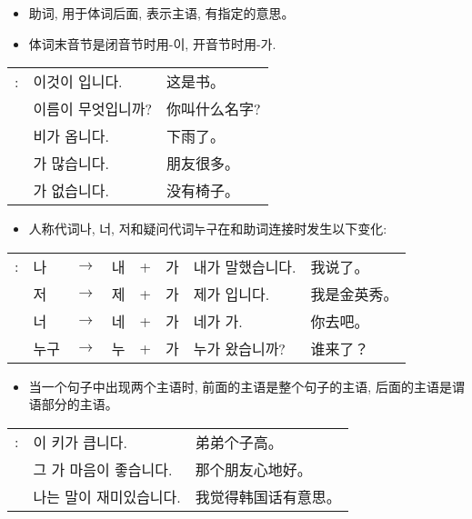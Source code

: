 \begin{grammar}
    \begin{grammarsect}[\kr -이 / -가]
        \begin{itemize}
            \item 助词, 用于体词后面, 表示主语, 有指定的意思。
            \item 体词末音节是闭音节时用{\kr -이}, 开音节时用{\kr -가}.
        \end{itemize}
        \begin{tabular}{lll}
            \kr \ruby{例}{예}:& \kr 이것이 \ruby{冊}{책}입니다.&这是书。\\
            &\kr 이름이 무엇입니까?&你叫什么名字?\\
            &\kr 비가 옵니다.&下雨了。\\
            &\kr \ruby{親舊}{친구}가 많습니다.&朋友很多。\\
            &\kr \ruby{椅子}{의자}가 없습니다.&没有椅子。
        \end{tabular}
        \begin{itemize}
            \item 人称代词{\kr 나, 너, 저}和疑问代词{\kr 누구}在和助词连接时发生以下变化:
        \end{itemize}
        \begin{tabular}{llllllll}
            \kr \ruby{例}{예}:&\kr 나 &$\to$&\kr 내&+&\kr 가&\kr 내가 말했습니다.&我说了。\\
            &\kr 저&$\to$&\kr 제&+ &\kr 가 &\kr 제가 \ruby{金英秀}{김영수}입니다. &我是金英秀。\\
            &\kr 너& $\to$ &\kr 네 &+ &\kr 가 &\kr 네가 가. &你去吧。\\
            &\kr 누구 &$\to$&\kr 누& + &\kr 가 &\kr 누가 왔습니까? &谁来了？\\
        \end{tabular}
        \begin{itemize}
            \item 当一个句子中出现两个主语时, 前面的主语是整个句子的主语, 后面的主语是谓语部分的主语。
        \end{itemize}
        \begin{tabular}{lll}
            \kr \ruby{例}{예}: &\kr \ruby{同生}{동생}이 키가 큽니다.&弟弟个子高。\\
            &\kr 그 \ruby{親舊}{친구}가 마음이 좋습니다.&那个朋友心地好。\\
            &\kr 나는 \ruby{韓國}{한국}말이 재미있습니다.&我觉得韩国话有意思。\\

\end{tabular}
\end{grammarsect}
\end{grammar}
